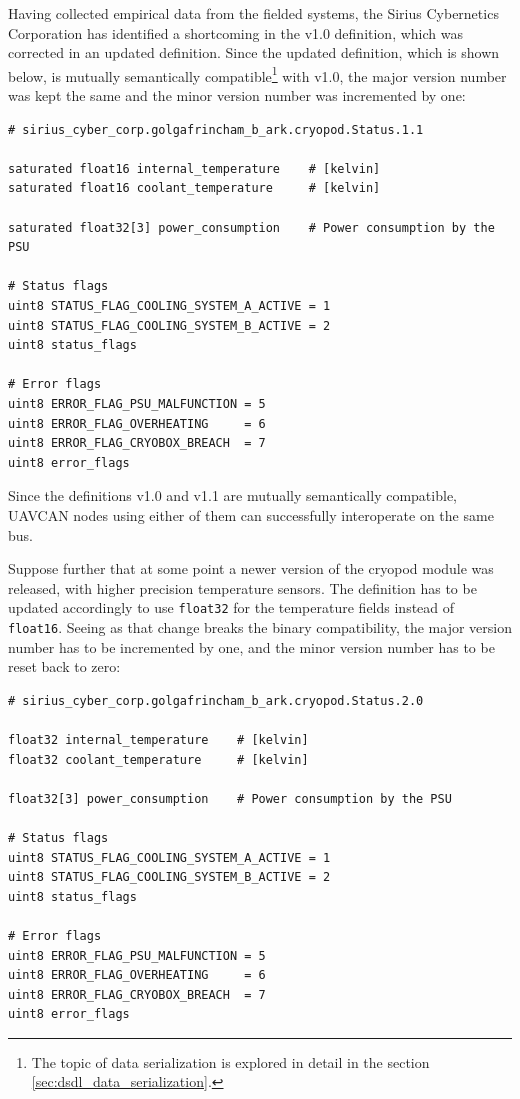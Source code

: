 Having collected empirical data from the fielded systems, the Sirius Cybernetics Corporation has
identified a shortcoming in the v1.0 definition, which was corrected in an updated definition.
Since the updated definition, which is shown below, is mutually semantically
compatible\footnote{The topic of data serialization is explored in detail in the section
\ref{sec:dsdl_data_serialization}.}
with v1.0, the major version number was kept the same and the minor version number was incremented by one:

\begin{verbatim}
# sirius_cyber_corp.golgafrincham_b_ark.cryopod.Status.1.1

saturated float16 internal_temperature    # [kelvin]
saturated float16 coolant_temperature     # [kelvin]

saturated float32[3] power_consumption    # Power consumption by the PSU

# Status flags
uint8 STATUS_FLAG_COOLING_SYSTEM_A_ACTIVE = 1
uint8 STATUS_FLAG_COOLING_SYSTEM_B_ACTIVE = 2
uint8 status_flags

# Error flags
uint8 ERROR_FLAG_PSU_MALFUNCTION = 5
uint8 ERROR_FLAG_OVERHEATING     = 6
uint8 ERROR_FLAG_CRYOBOX_BREACH  = 7
uint8 error_flags
\end{verbatim}

Since the definitions v1.0 and v1.1 are mutually semantically compatible,
UAVCAN nodes using either of them can successfully interoperate on the same bus.

Suppose further that at some point a newer version of the cryopod module was released,
with higher precision temperature sensors.
The definition has to be updated accordingly to use \verb|float32| for the temperature fields
instead of \verb|float16|.
Seeing as that change breaks the binary compatibility,
the major version number has to be incremented by one, and the minor version number has to be reset back to zero:

\begin{verbatim}
# sirius_cyber_corp.golgafrincham_b_ark.cryopod.Status.2.0

float32 internal_temperature    # [kelvin]
float32 coolant_temperature     # [kelvin]

float32[3] power_consumption    # Power consumption by the PSU

# Status flags
uint8 STATUS_FLAG_COOLING_SYSTEM_A_ACTIVE = 1
uint8 STATUS_FLAG_COOLING_SYSTEM_B_ACTIVE = 2
uint8 status_flags

# Error flags
uint8 ERROR_FLAG_PSU_MALFUNCTION = 5
uint8 ERROR_FLAG_OVERHEATING     = 6
uint8 ERROR_FLAG_CRYOBOX_BREACH  = 7
uint8 error_flags
\end{verbatim}


